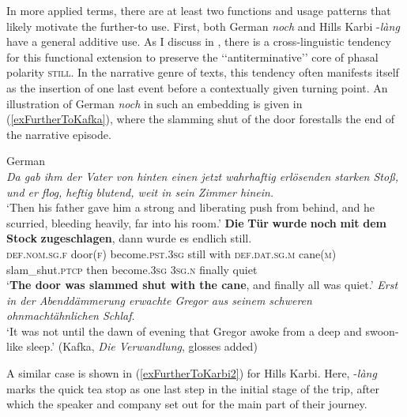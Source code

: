 {In more applied terms, there are at least two functions and usage patterns that likely motivate the further-to use. First, both German \textit{noch} and Hills Karbi \mbox{-\textit{làng}} have a general additive use. As I discuss in , there is a cross-linguistic tendency for this functional extension to preserve the \lq\lq antiterminative\rq\rq{ }\parencite{Vandeweghe1984} core of phasal polarity \textsc{still}. In the narrative genre of texts, this tendency often manifests itself as the insertion of one last event before a contextually given turning point. An illustration of German \textit{noch} in such an embedding is given in (\ref{exFurtherToKafka}), where the slamming shut of the door forestalls the end of the narrative episode.

\begin{exe}
	\ex German\label{exFurtherToKafka}\\
	\textit{Da gab ihm der Vater von hinten einen jetzt wahrhaftig erlösenden starken Stoß, und er flog, heftig blutend, weit in sein Zimmer hinein.}\\
	\lq Then his father gave him a strong and liberating push from behind, and he scurried, bleeding heavily, far into his room.'
	\exi{}\gll \textbf{Die} \textbf{Tür} \textbf{wurde} \textbf{noch} \textbf{mit} \textbf{dem} \textbf{Stock} \textbf{zugeschlagen}, dann wurde es endlich still.\\
	\textsc{def}.\textsc{nom}.\textsc{sg}.\textsc{f} door(\textsc{f}) become.\textsc{pst}.3\textsc{sg} still with \textsc{def}.\textsc{dat}.\textsc{sg}.\textsc{m} cane(\textsc{m}) slam\_shut.\textsc{ptcp} then become.3\textsc{sg} 3\textsc{sg}.\textsc{n} finally quiet\\
	\glt \lq \textbf{The door was slammed shut with the cane}, and finally all was quiet.'
	\exi{}\textit{Erst in der Abenddämmerung erwachte Gregor aus seinem schweren ohnmachtähnlichen Schlaf}.\\
\lq It was not until the dawn of evening that Gregor awoke from a deep and swoon-like sleep.' (Kafka, \textit{Die Verwandlung}, glosses added)
\end{exe}

A similar case is shown in (\ref{exFurtherToKarbi2}) for Hills Karbi. Here, \mbox{-\textit{làng}} marks the quick tea stop as one last step in the initial stage of the trip, after which the speaker and company set out for the main part of their journey.\pagebreak

}
